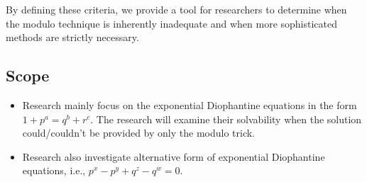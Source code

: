 \documentclass[12pt]{article}
\begin{document}
 By defining these criteria, we provide a tool for researchers to determine when the modulo technique is inherently inadequate and when more sophisticated methods are strictly necessary.\\
\subsection*{Scope}
\begin{itemize}
    \item[-] Research mainly focus on the exponential Diophantine equations in the form $1+p^a =q^b + r^c$. The research will examine their solvability when the solution could/couldn't be provided by only the modulo trick.
     \item[-] Research also investigate alternative form of exponential Diophantine equations, i.e., $p^x-p^y+q^z-q^w=0$.
\end{itemize}
\end{document}
